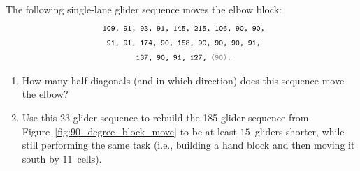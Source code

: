 \begin{multicols}{2}
\mfilbreak


\begin{problem}\label{exer:push_elbow_longer}
	The following single-lane glider sequence moves the elbow block:
	\begin{align*}
		& \text{\texttt{\footnotesize~109, 91, 93, 91, 145, 215, 106, 90, 90,}} \\
		& \text{\texttt{\footnotesize~~91, 91, 174, 90, 158, 90, 90, 90, 91,}} \\
		& \text{\texttt{\footnotesize~~~~~~~~~137, 90, 91, 127, {\color{gray}(90)}.}}
	\end{align*}
	
	\begin{enumerate}[label=\bf\color{ocre}(\alph*)]
		\item How many half-diagonals (and in which direction) does this sequence move the elbow?
		
		\item Use this 23-glider sequence to rebuild the 185-glider sequence from Figure~\ref{fig:90_degree_block_move} to be at least $15$~gliders shorter, while still performing the same task (i.e., building a hand block and then moving it south by $11$~cells).
	\end{enumerate}
\end{problem}

\end{multicols}
\normalsize\vspace*{0.01cm}
